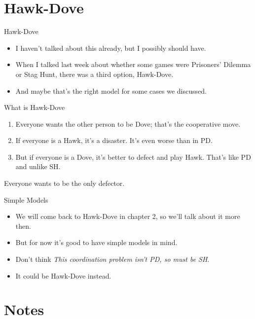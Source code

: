 \documentclass[
  ignorenonframetext,
]{beamer}
\providecommand{\tightlist}{%
  \setlength{\itemsep}{0pt}\setlength{\parskip}{0pt}}
\begin{document}
\hypertarget{hawk-dove}{%
\section{Hawk-Dove}\label{hawk-dove}}

\begin{frame}{Hawk-Dove}
\protect\hypertarget{hawk-dove-1}{}
\begin{itemize}
\tightlist
\item
  I haven't talked about this already, but I possibly should have.
\item
  When I talked last week about whether some games were Prisoners'
  Dilemma or Stag Hunt, there was a third option, Hawk-Dove.
\item
  And maybe that's the right model for some cases we discussed.
\end{itemize}
\end{frame}

\begin{frame}{What is Hawk-Dove}
\protect\hypertarget{what-is-hawk-dove}{}
\begin{enumerate}
\tightlist
\item
  Everyone wants the other person to be Dove; that's the cooperative
  move.
\item
  If everyone is a Hawk, it's a disaster. It's even worse than in PD.
\item
  But if everyone is a Dove, it's better to defect and play Hawk. That's
  like PD and unlike SH.
\end{enumerate}

Everyone wants to be the only defector.
\end{frame}

\begin{frame}{Simple Models}
\protect\hypertarget{simple-models}{}
\begin{itemize}
\tightlist
\item
  We will come back to Hawk-Dove in chapter 2, so we'll talk about it
  more then.
\item
  But for now it's good to have simple models in mind.
\item
  Don't think \emph{This coordination problem isn't PD, so must be SH}.
\item
  It could be Hawk-Dove instead.
\end{itemize}
\end{frame}

\hypertarget{notes}{%
\section{Notes}\label{notes}}
\end{document}
